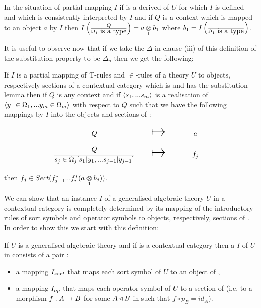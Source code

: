 \begin{observation}
In the situation of  partial mapping $I$ 
if \ZOmega is a derived of $U$ for which $I$ is defined and which is consistently interpreted by $I$ and if $Q$ is a context which is mapped to an object $a$ by $I$ 
then $\Imappedrule{Q}{\isT{\Omega_1}}=\crossx{a}{b_1}{1}$ where $b_1=\Imappedrule{}{\isT{\Omega_1}}$.
\end{observation}


\begin{oldtt}
It is useful to observe now that if we take the  $\Delta$ in clause (iii) of this definition of the substitution property 
to be $\Delta_n$ then we get the following:
\begin{observation}
\newcommand {\forceSOURCEwidth}{\rule{5cm}{0pt}}  %
\newcommand {\forceTARGETwidth}{\rule{2.2cm}{0pt}}
If $I$ is a partial mapping of T-rules and $\in$-rules of a theory $U$ to objects, respectively sections of a contextual category \catcw
which is  and has the substitution lemma then if $Q$ is any context and if $\tuple{\sm}$ is a realisation of $\tuple{\yOmega{m}}$ with respect to $Q$
such that we have the following mappings by $I$ into the objects and sections of \catc:
\begin{equation*}
\begin{array}{c c c}
\forceSOURCEwidth & & \forceTARGETwidth \\ [-0.1cm]
Q          & \Imapsto & a   \\ [0.4cm]
\IsOmega{j}    & \Imapsto & f_j \\ [0.4cm]
\end{array}
\end{equation*}
then $f_j \in Sect(f_{j-1}^*...f_i^*(\crossx{a}{b_j}{1}))$.
\end{observation}
\end{oldtt}


We can show that an instance $I$ of a generalised algebraic theory $U$ in a contextual category \catcw is
completely determined by its mapping of the introductory rules of sort symbols and operator symbols to
objects, respectively, sections of \catc. In order to show this we start with this definition:
\begin{definition}
If $U$ is a generalised algebraic theory  and if \catcw is a contextual category then
a  $I$ of  $U$ in \catcw consists of a pair :
\begin{itemize}
\item a mapping $\Isort$ that maps each sort symbol of $U$ to  an object of \catc,
\item a mapping $\Iop$ that maps each operator symbol of $U$ to a section of \catcw (i.e. to a morphism $f: A \morph B$ for some 
$A \base B$ in \catcw such that $f \circ p_B=id_A$).
\end{itemize}
\end{definition}


